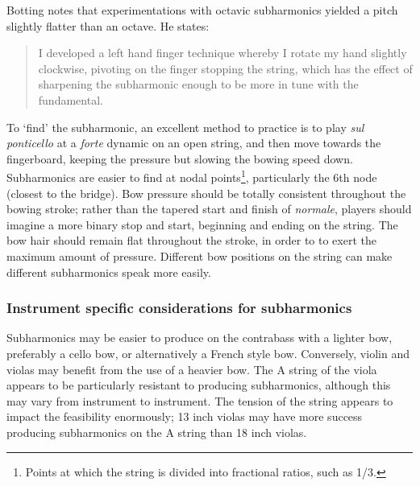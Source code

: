 Botting notes that experimentations with octavic subharmonics yielded a pitch slightly flatter than an octave. He states: \begin{quotation}
  I developed a left hand finger technique whereby I rotate my hand slightly clockwise, pivoting on the finger stopping the string, which has the effect of sharpening the subharmonic enough to be more in tune with the fundamental.\autocite[111]{bottingDevelopingPersonalVocabulary2019}
\end{quotation}

To `find' the subharmonic, an excellent method to practice is to play \emph{sul ponticello} at a \emph{forte} dynamic on an open string, and then move towards the fingerboard, keeping the pressure but slowing the bowing speed down.
Subharmonics are easier to find at nodal points\footnote{Points at which the string is divided into fractional ratios, such as 1/3.}, particularly the 6th node (closest to the bridge).\autocite[]{appleseedFeedbackSightreadingSession2019}
Bow pressure should be totally consistent throughout the bowing stroke; rather than the tapered start and finish of \emph{normale}, players should imagine a more binary stop and start, beginning and ending on the string.
The bow hair should remain flat throughout the stroke, in order to to exert the maximum amount of pressure.\autocite[]{kimuraHowProduceSubharmonics1999}
Different bow positions on the string can make different subharmonics speak more easily.\autocite[]{kimuraHowProduceSubharmonics1999}

\subsubsection{Instrument specific considerations for subharmonics}
Subharmonics may be easier to produce on the contrabass with a lighter bow, preferably a cello bow, or alternatively a French style bow.\autocite[]{longSubharmonics2019}
Conversely, violin and violas may benefit from the use of a heavier bow.\autocite[]{appleseedFeedbackSightreadingSession2019}
The A string of the viola appears to be particularly resistant to producing subharmonics, although this may vary from instrument to instrument.\autocite[]{appleseedFeedbackSightreadingSession2019}
The tension of the string appears to impact the feasibility enormously; 13 inch violas may have more success producing subharmonics on the A string than 18 inch violas.\autocite[]{appleseedFeedbackSightreadingSession2019}




